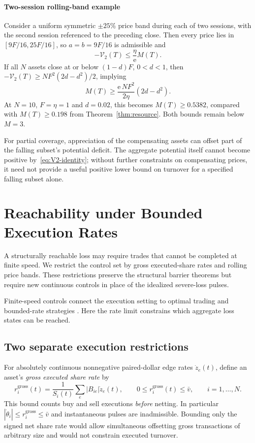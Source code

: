 \documentclass[review,hidelinks,onefignum,onetabnum]{siamonline250211}
\begin{document}
\paragraph{Two-session rolling-band example}
Consider a uniform symmetric $\pm25\%$ price band during each of two
sessions, with the second session referenced to the preceding close.
Then every price lies in
$[9F/16,25F/16]$, so $a=b=9F/16$ is admissible and
\[
-\mathcal V_2(T)\le\frac{\eta}{\mathrm e}M(T).
\]
If all $N$ assets close at or below $(1-d)F$, $0<d<1$, then
$-\mathcal V_2(T)\ge NF^2(2d-d^2)/2$, implying
\[
M(T)\ge\frac{\mathrm e\,NF^2}{2\eta}(2d-d^2).
\]
At $N=10$, $F=\eta=1$ and $d=0.02$, this becomes
$M(T)\ge0.5382$, compared with $M(T)\ge0.198$ from
Theorem~\ref{thm:resource}. Both bounds remain below $M=3$.

For partial coverage, appreciation of the compensating assets can
offset part of the falling subset's potential deficit. The aggregate
potential itself cannot become positive by~\eqref{eq:V2-identity};
without further constraints on compensating prices, it need not
provide a useful positive lower bound on turnover for a specified
falling subset alone.


\section{Reachability under Bounded Execution Rates}\label{sec:rateband}
A structurally reachable loss may require trades that cannot be completed at finite speed. We restrict the control set by gross executed-share rates and rolling price bands. These restrictions preserve the structural barrier theorems but require new continuous controls in place of the idealized severe-loss pulses.

Finite-speed controls connect the execution setting to optimal trading and bounded-rate strategies \citep{AlmgrenChriss2001,Yang2019}. Here the rate limit constrains which aggregate loss states can be reached.

\subsection{Two separate execution restrictions}\label{subsec:execution-restrictions}
For absolutely continuous nonnegative paired-dollar edge rates $\dot z_e(t)$, define an asset's \emph{gross executed share rate} by
\begin{equation}\label{eq:grossrate}
 r_i^{\mathrm{gross}}(t)=\frac{1}{S_i(t)}\sum_e |B_{ie}|\dot z_e(t),\qquad
 0\le r_i^{\mathrm{gross}}(t)\le\bar v,\qquad i=1,\ldots,N.
\end{equation}
This bound counts buy and sell executions \emph{before} netting. In particular $|\dot\theta_i|\le r_i^{\mathrm{gross}}\le\bar v$ and instantaneous pulses are inadmissible. Bounding only the signed net share rate would allow simultaneous offsetting gross transactions of arbitrary size and would not constrain executed turnover.
\end{document}
